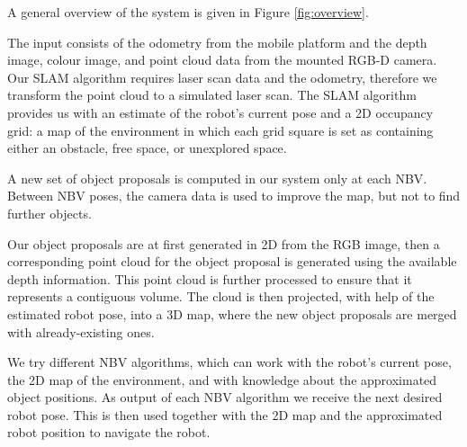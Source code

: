 A general overview of the system is given in Figure \ref{fig:overview}.

The input consists of the odometry from the mobile platform and the depth image, colour image, and point cloud data from the mounted RGB-D camera.
Our SLAM algorithm requires laser scan data and the odometry, therefore we transform the point cloud to a simulated laser scan.
The SLAM algorithm provides us with an estimate of the robot's current pose and a 2D occupancy grid: a map of the environment in which each grid square is set as containing either an obstacle, free space, or unexplored space. 

A new set of object proposals is computed in our system only at each NBV.
Between NBV poses, the camera data is used to improve the map, but not to find further objects.

Our object proposals are at first generated in 2D from the RGB image, then a corresponding point cloud for the object proposal is generated using the available depth information.
This point cloud is further processed to ensure that it represents a contiguous volume.
The cloud is then projected, with help of the estimated robot pose, into a 3D map, where the new object proposals are merged with already-existing ones.

We try different NBV algorithms, which can work with the robot's current pose, the 2D map of the environment, and with knowledge about the approximated object positions.
As output of each NBV algorithm we receive the next desired robot pose.
This is then used together with the 2D map and the approximated robot position to navigate the robot.


